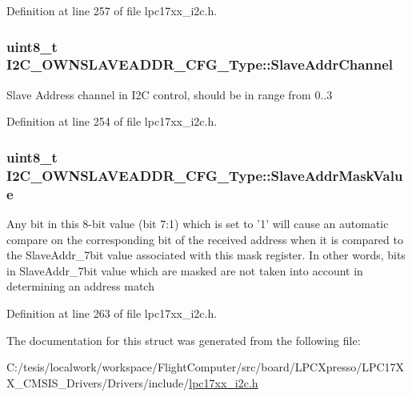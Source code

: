 \-Definition at line 257 of file lpc17xx\-\_\-i2c.\-h.

\hypertarget{struct_i2_c___o_w_n_s_l_a_v_e_a_d_d_r___c_f_g___type_a837b455a7cd6e12fc75175e4a3eebe7d}{
\subsubsection[{\-Slave\-Addr\-Channel}]{\setlength{\rightskip}{0pt plus 5cm}uint8\-\_\-t {\bf \-I2\-C\-\_\-\-O\-W\-N\-S\-L\-A\-V\-E\-A\-D\-D\-R\-\_\-\-C\-F\-G\-\_\-\-Type\-::\-Slave\-Addr\-Channel}}}\label{struct_i2_c___o_w_n_s_l_a_v_e_a_d_d_r___c_f_g___type_a837b455a7cd6e12fc75175e4a3eebe7d}
\-Slave \-Address channel in \-I2\-C control, should be in range from 0..3 

\-Definition at line 254 of file lpc17xx\-\_\-i2c.\-h.

\hypertarget{struct_i2_c___o_w_n_s_l_a_v_e_a_d_d_r___c_f_g___type_ad7ade56e1eca1d7c2206ea2c81d2e9f6}{
\subsubsection[{\-Slave\-Addr\-Mask\-Value}]{\setlength{\rightskip}{0pt plus 5cm}uint8\-\_\-t {\bf \-I2\-C\-\_\-\-O\-W\-N\-S\-L\-A\-V\-E\-A\-D\-D\-R\-\_\-\-C\-F\-G\-\_\-\-Type\-::\-Slave\-Addr\-Mask\-Value}}}\label{struct_i2_c___o_w_n_s_l_a_v_e_a_d_d_r___c_f_g___type_ad7ade56e1eca1d7c2206ea2c81d2e9f6}
\-Any bit in this 8-\/bit value (bit 7\-:1) which is set to '1' will cause an automatic compare on the corresponding bit of the received address when it is compared to the \-Slave\-Addr\-\_\-7bit value associated with this mask register. \-In other words, bits in \-Slave\-Addr\-\_\-7bit value which are masked are not taken into account in determining an address match 

\-Definition at line 263 of file lpc17xx\-\_\-i2c.\-h.



\-The documentation for this struct was generated from the following file\-:\begin{DoxyCompactItemize}
\item 
\-C\-:/tesis/localwork/workspace/\-Flight\-Computer/src/board/\-L\-P\-C\-Xpresso/\-L\-P\-C17\-X\-X\-\_\-\-C\-M\-S\-I\-S\-\_\-\-Drivers/\-Drivers/include/\hyperlink{lpc17xx__i2c_8h}{lpc17xx\-\_\-i2c.\-h}\end{DoxyCompactItemize}
